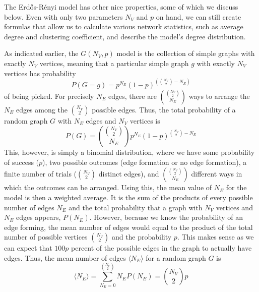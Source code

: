 \documentclass[12pt,twoside]{amherstthesis}
\begin{document}
  The Erdős-Rényi model has other nice properties, some of which we
  discuss below. Even with only two parameters \(N_{V}\) and \(p\) on
  hand, we can still create formulas that allow us to calculate various
  network statistics, such as average degree and clustering coefficient,
  and describe the model's degree distribution.
  
  As indicated earlier, the \(G(N_V, p)\) model is the collection of
  simple graphs with exactly \(N_{V}\) vertices, meaning that a particular
  simple graph \(g\) with exactly \(N_V\) vertices has probability
  \[P(G = g) = p^{N_E}(1 - p)^{\left({N_V \choose 2} - N_E \right)}\] of
  being picked. For precisely \(N_E\) edges, there are
  \({{N_{V} \choose 2} \choose N_{E}}\) ways to arrange the \(N_{E}\)
  edges among the \({N_V \choose 2}\) possible edges. Thus, the total
  probability of a random graph \(G\) with \(N_{E}\) edges and \(N_{V}\)
  vertices is
  \[P(G) = {{N_{V} \choose 2} \choose N_{E}}p^{N_E}(1 - p)^{{N_V \choose 2} - N_E}\]
  This, however, is simply a binomial distribution, where we have some
  probability of success (\(p\)), two possible outcomes (edge formation or
  no edge formation), a finite number of trials (\({N_{V} \choose 2}\)
  distinct edges), and \({{N_{V} \choose 2} \choose N_{E}}\) different
  ways in which the outcomes can be arranged. Using this, the mean value
  of \(N_E\) for the model is then a weighted average. It is the sum of
  the products of every possible number of edges \(N_E\) and the total
  probability that a graph with \(N_{V}\) vertices and \(N_{E}\) edges
  appears, \(P(N_{E})\). However, because we know the probability of an
  edge forming, the mean number of edges would equal to the product of the
  total number of possible vertices \({N_{V} \choose 2}\) and the
  probability \(p\). This makes sense as we can expect that \(100p\)
  percent of the possible edges in the graph to actually have edges. Thus,
  the mean number of edges \(\langle N_{E} \rangle\) for a random graph
  \(G\) is
  \[ \langle N_{E} \rangle = \sum_{N_{E}=0}^{{N_{V} \choose 2}} N_{E}P(N_{E}) = {N_{V} \choose 2}p\]
  
\end{document}
